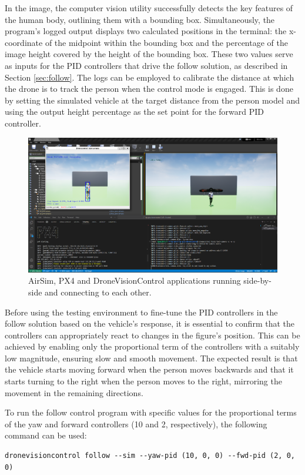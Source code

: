 In the image, the computer vision utility successfully detects the key features of the human body, outlining them with a bounding box. Simultaneously, the program's logged output displays two calculated positions in the terminal: the x-coordinate of the midpoint within the bounding box and the percentage of the image height covered by the height of the bounding box.
These two values serve as inputs for the PID controllers that drive the follow solution, as described in Section \ref{sec:follow}. The logs can be employed to calibrate the distance at which the drone is to track the person when the control mode is engaged. This is done by setting the simulated vehicle at the target distance from the person model and using the output height percentage as the set point for the forward PID controller.

\begin{figure}[H]
  \centering
  \includegraphics[width=\textwidth, keepaspectratio]{img/airsim-sitl-pose.png}
  \caption{AirSim, PX4 and DroneVisionControl applications running side-by-side and connecting to each other.}
  \label{fig:airsim-sitl-pose}
\end{figure}

Before using the testing environment to fine-tune the PID controllers in the follow solution based on the vehicle's response, it is essential to confirm that the controllers can appropriately react to changes in the figure's position. This can be achieved by enabling only the proportional term of the controllers with a suitably low magnitude, ensuring slow and smooth movement. The expected result is that the vehicle starts moving forward when the person moves backwards and that it starts turning to the right when the person moves to the right, mirroring the movement in the remaining directions.

To run the follow control program with specific values for the proportional terms of the yaw and forward controllers (10 and 2, respectively), the following command can be used:

\begin{verbatim}
dronevisioncontrol follow --sim --yaw-pid (10, 0, 0) --fwd-pid (2, 0, 0)
\end{verbatim}